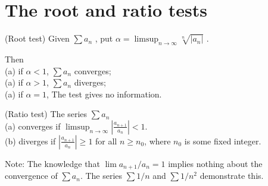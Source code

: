 \section{The root and ratio tests}

\begin{thm}(Root test)
    \label{thm:3.33}
    Given $\sum a_n$ , put $\alpha = \limsup_{n \rightarrow \infty} \sqrt[n]{|a_n|} $ .

    Then \\
    (a) if $\alpha < 1$, $\sum a_n$ converges; \\
    (a) if $\alpha > 1$, $\sum a_n$ diverges; \\
    (a) if $\alpha = 1$, The test gives no information.
\end{thm}


\begin{thm}(Ratio test)
    \label{thm:3.34 ratio test}
    The series $\sum a_n$ \\
    (a) converges if $\limsup_{n \to \infty} \left|\frac{a_{n+1}}{a_n}\right| < 1$. \\
    (b) diverges if $\left|\frac{a_{n+1}}{a_n}\right| \geq 1$ for all $n \geq n_0$, where $n_0$ is some fixed integer.
\end{thm}


Note: The knowledge that $\lim a_{n+1}/a_n = 1$ implies nothing about the convergence of $\sum a_n$.
The series $\sum 1/n$ and $\sum 1/n^2$ demonstrate this.

